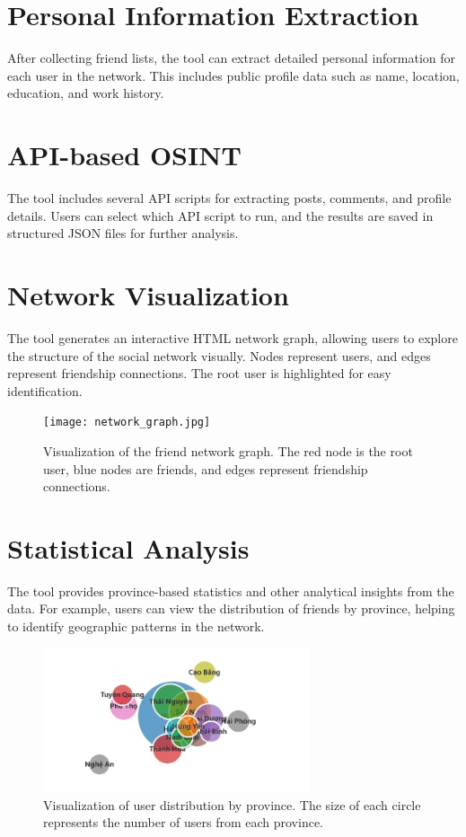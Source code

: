 \documentclass[13pt,a4paper]{report}
\begin{document}
\section{Personal Information Extraction}
After collecting friend lists, the tool can extract detailed personal information for each user in the network. This includes public profile data such as name, location, education, and work history.

\section{API-based OSINT}
The tool includes several API scripts for extracting posts, comments, and profile details. Users can select which API script to run, and the results are saved in structured JSON files for further analysis.

\section{Network Visualization}
The tool generates an interactive HTML network graph, allowing users to explore the structure of the social network visually. Nodes represent users, and edges represent friendship connections. The root user is highlighted for easy identification.

\begin{figure}[h!]
    \centering
    \texttt{[image: network\_graph.jpg]}
    \caption{Visualization of the friend network graph. The red node is the root user, blue nodes are friends, and edges represent friendship connections.}
\end{figure}

\section{Statistical Analysis}
The tool provides province-based statistics and other analytical insights from the data. For example, users can view the distribution of friends by province, helping to identify geographic patterns in the network.

\begin{figure}[h!]
    \centering
    \includegraphics[width=0.7\textwidth]{province_stats.jpg}
    \caption{Visualization of user distribution by province. The size of each circle represents the number of users from each province.}
\end{figure}
\end{document}
